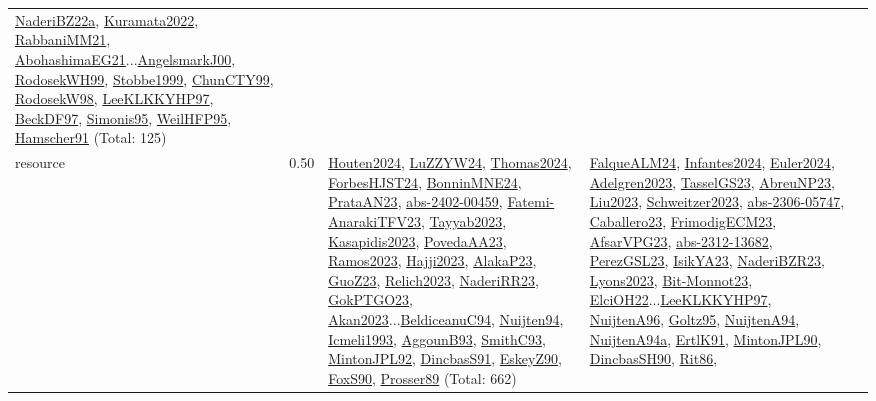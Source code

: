 {\begin{longtable}{p{3cm}r>{\raggedright\arraybackslash}p{6cm}>{\raggedright\arraybackslash}p{6cm}>{\raggedright\arraybackslash}p{8cm}}
\hyperref[detail:NaderiBZ22a]{NaderiBZ22a}, \hyperref[detail:Kuramata2022]{Kuramata2022}, \hyperref[detail:RabbaniMM21]{RabbaniMM21}, \hyperref[detail:AbohashimaEG21]{AbohashimaEG21}...\hyperref[detail:AngelsmarkJ00]{AngelsmarkJ00}, \hyperref[detail:RodosekWH99]{RodosekWH99}, \hyperref[detail:Stobbe1999]{Stobbe1999}, \hyperref[detail:ChunCTY99]{ChunCTY99}, \hyperref[detail:RodosekW98]{RodosekW98}, \hyperref[detail:LeeKLKKYHP97]{LeeKLKKYHP97}, \hyperref[detail:BeckDF97]{BeckDF97}, \hyperref[detail:Simonis95]{Simonis95}, \hyperref[detail:WeilHFP95]{WeilHFP95}, \hyperref[detail:Hamscher91]{Hamscher91} (Total: 125)\\
\index{resource}\index{Scheduling!resource}resource &  0.50 & \hyperref[detail:Houten2024]{Houten2024}, \hyperref[detail:LuZZYW24]{LuZZYW24}, \hyperref[detail:Thomas2024]{Thomas2024}, \hyperref[detail:ForbesHJST24]{ForbesHJST24}, \hyperref[detail:BonninMNE24]{BonninMNE24}, \hyperref[detail:PrataAN23]{PrataAN23}, \hyperref[detail:abs-2402-00459]{abs-2402-00459}, \hyperref[detail:Fatemi-AnarakiTFV23]{Fatemi-AnarakiTFV23}, \hyperref[detail:Tayyab2023]{Tayyab2023}, \hyperref[detail:Kasapidis2023]{Kasapidis2023}, \hyperref[detail:PovedaAA23]{PovedaAA23}, \hyperref[detail:Ramos2023]{Ramos2023}, \hyperref[detail:Hajji2023]{Hajji2023}, \hyperref[detail:AlakaP23]{AlakaP23}, \hyperref[detail:GuoZ23]{GuoZ23}, \hyperref[detail:Relich2023]{Relich2023}, \hyperref[detail:NaderiRR23]{NaderiRR23}, \hyperref[detail:GokPTGO23]{GokPTGO23}, \hyperref[detail:Akan2023]{Akan2023}...\hyperref[detail:BeldiceanuC94]{BeldiceanuC94}, \hyperref[detail:Nuijten94]{Nuijten94}, \hyperref[detail:Icmeli1993]{Icmeli1993}, \hyperref[detail:AggounB93]{AggounB93}, \hyperref[detail:SmithC93]{SmithC93}, \hyperref[detail:MintonJPL92]{MintonJPL92}, \hyperref[detail:DincbasS91]{DincbasS91}, \hyperref[detail:EskeyZ90]{EskeyZ90}, \hyperref[detail:FoxS90]{FoxS90}, \hyperref[detail:Prosser89]{Prosser89} (Total: 662) & \hyperref[detail:FalqueALM24]{FalqueALM24}, \hyperref[detail:Infantes2024]{Infantes2024}, \hyperref[detail:Euler2024]{Euler2024}, \hyperref[detail:Adelgren2023]{Adelgren2023}, \hyperref[detail:TasselGS23]{TasselGS23}, \hyperref[detail:AbreuNP23]{AbreuNP23}, \hyperref[detail:Liu2023]{Liu2023}, \hyperref[detail:Schweitzer2023]{Schweitzer2023}, \hyperref[detail:abs-2306-05747]{abs-2306-05747}, \hyperref[detail:Caballero23]{Caballero23}, \hyperref[detail:FrimodigECM23]{FrimodigECM23}, \hyperref[detail:AfsarVPG23]{AfsarVPG23}, \hyperref[detail:abs-2312-13682]{abs-2312-13682}, \hyperref[detail:PerezGSL23]{PerezGSL23}, \hyperref[detail:IsikYA23]{IsikYA23}, \hyperref[detail:NaderiBZR23]{NaderiBZR23}, \hyperref[detail:Lyons2023]{Lyons2023}, \hyperref[detail:Bit-Monnot23]{Bit-Monnot23}, \hyperref[detail:ElciOH22]{ElciOH22}...\hyperref[detail:LeeKLKKYHP97]{LeeKLKKYHP97}, \hyperref[detail:NuijtenA96]{NuijtenA96}, \hyperref[detail:Goltz95]{Goltz95}, \hyperref[detail:NuijtenA94]{NuijtenA94}, \hyperref[detail:NuijtenA94a]{NuijtenA94a}, \hyperref[detail:ErtlK91]{ErtlK91}, \hyperref[detail:MintonJPL90]{MintonJPL90}, \hyperref[detail:DincbasSH90]{DincbasSH90}, \hyperref[detail:Rit86]{Rit86}, 
\end{longtable}}
